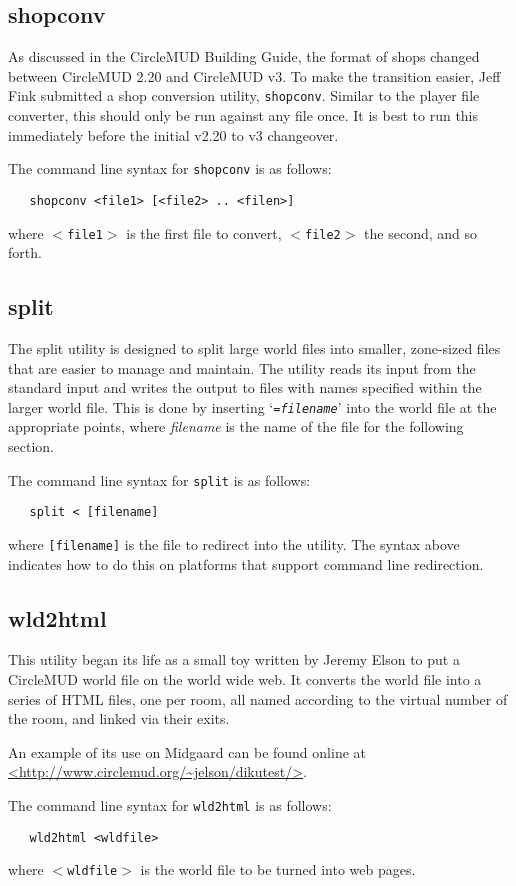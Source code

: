 \documentclass[11pt]{article}
\begin{document}
\subsection{shopconv}
As discussed in the CircleMUD Building Guide, the format of shops changed between CircleMUD 2.20 and CircleMUD v3.  To make the transition easier, Jeff Fink submitted a shop conversion utility, \texttt{shopconv}.  Similar to the player file converter, this should only be run against any file once.  It is best to run this immediately before the initial v2.20 to v3 changeover.
\par
The command line syntax for \texttt{shopconv} is as follows:
\begin{verbatim}
   shopconv <file1> [<file2> .. <filen>]
\end{verbatim}
where \texttt{$<$file1$>$} is the first file to convert, \texttt{$<$file2$>$} the second, and so forth.

\subsection{split}
The split utility is designed to split large world files into smaller, zone-sized files that are easier to manage and maintain.  The utility reads its input from the standard input and writes the output to files with names specified within the larger world file.  This is done by inserting `\texttt{={\it filename}}' into the world file at the appropriate points, where {\it filename} is the name of the file for the following section.
\par
The command line syntax for \texttt{split} is as follows:
\begin{verbatim}
   split < [filename]
\end{verbatim}
where \texttt{[filename]} is the file to redirect into the utility.  The syntax above indicates how to do this on platforms that support command line redirection.

\subsection{wld2html}
This utility began its life as a small toy written by Jeremy Elson to put a CircleMUD world file on the world wide web.  It converts the world file into a series of HTML files, one per room, all named according to the virtual number of the room, and linked via their exits.
\par 
An example of its use on Midgaard can be found online at
\url{<http://www.circlemud.org/~jelson/dikutest/>}.
\par
The command line syntax for \texttt{wld2html} is as follows:
\begin{verbatim}
   wld2html <wldfile>
\end{verbatim}
where \texttt{$<$wldfile$>$} is the world file to be turned into web pages.
\end{document}
